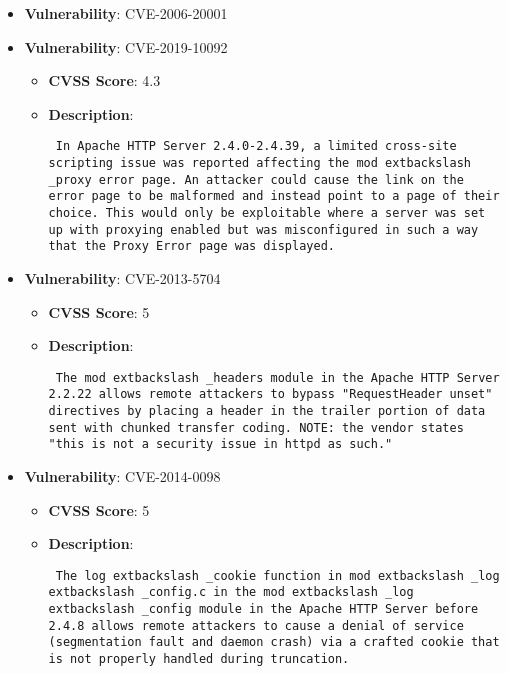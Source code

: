 \documentclass{article}
\begin{document}
\begin{itemize}
        \item \textbf{Vulnerability}: CVE-2006-20001
    
        \item \textbf{Vulnerability}: CVE-2019-10092
        \begin{itemize}
            \item \textbf{CVSS Score}:  4.3 
            \item \textbf{Description}: \parbox{\linewidth}{\texttt{ In Apache HTTP Server 2.4.0-2.4.39, a limited cross-site scripting issue was reported affecting the mod	extbackslash _proxy error page. An attacker could cause the link on the error page to be malformed and instead point to a page of their choice. This would only be exploitable where a server was set up with proxying enabled but was misconfigured in such a way that the Proxy Error page was displayed. }}
        \end{itemize}
    
        \item \textbf{Vulnerability}: CVE-2013-5704
        \begin{itemize}
            \item \textbf{CVSS Score}:  5 
            \item \textbf{Description}: \parbox{\linewidth}{\texttt{ The mod	extbackslash _headers module in the Apache HTTP Server 2.2.22 allows remote attackers to bypass "RequestHeader unset" directives by placing a header in the trailer portion of data sent with chunked transfer coding.  NOTE: the vendor states "this is not a security issue in httpd as such." }}
        \end{itemize}
    
        \item \textbf{Vulnerability}: CVE-2014-0098
        \begin{itemize}
            \item \textbf{CVSS Score}:  5 
            \item \textbf{Description}: \parbox{\linewidth}{\texttt{ The log	extbackslash _cookie function in mod	extbackslash _log	extbackslash _config.c in the mod	extbackslash _log	extbackslash _config module in the Apache HTTP Server before 2.4.8 allows remote attackers to cause a denial of service (segmentation fault and daemon crash) via a crafted cookie that is not properly handled during truncation. }}
        \end{itemize}
    

\end{itemize}
\end{document}
